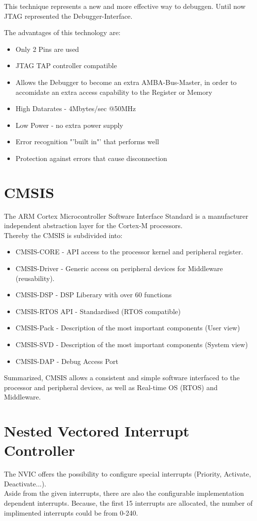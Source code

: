 This technique represents a new and more effective way to debuggen. Until now JTAG
represented the Debugger-Interface.


The advantages of this technology are:

\begin{itemize}
\item Only 2 Pins are used
\item JTAG TAP controller compatible
\item Allows the Debugger to become an extra AMBA-Bus-Master, in order to accomidate an extra
access capability to the Register or Memory
\item High Datarates - 4Mbytes/sec @50MHz
\item Low Power - no extra power supply
\item Error recognition "'built in"' that performs well
\item Protection against errors that cause disconnection
\end{itemize}

\section{CMSIS}
The ARM Cortex Microcontroller Software Interface Standard is a manufacturer independent
abstraction layer for the Cortex-M processors.\\
Thereby the CMSIS is subdivided into:
\begin{itemize}
\item CMSIS-CORE - API access to the processor kernel and peripheral register.
\item CMSIS-Driver - Generic access on peripheral devices for Middleware
			(reusability).
\item CMSIS-DSP - DSP Liberary with over 60 functions
\item CMSIS-RTOS API - Standardised (RTOS compatible)
\item CMSIS-Pack - Description of the most important components (User view)
\item CMSIS-SVD - Description of the most important components (System view)
\item CMSIS-DAP - Debug Access Port
\end{itemize}

Summarized, CMSIS allows a consistent and simple software interfaced to the processor
and peripheral devices, as well as Real-time OS (RTOS) and Middleware.

\section{Nested Vectored Interrupt Controller}
The NVIC offers the possibility to configure special interrupts
(Priority, Activate, Deactivate...). \\
Aside from the given interrupts, there are also the configurable implementation dependent interrupts.
Because, the first 15 interrupts are allocated, the number of implimented interrupts could be from 0-240.

